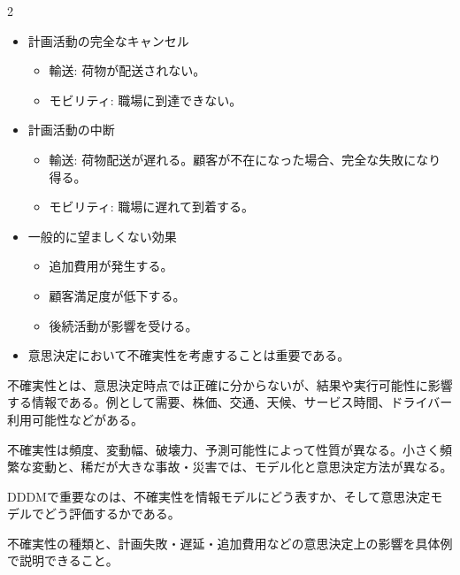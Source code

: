 \begin{multicols}{2}

\footnotesize

\raggedcolumns


\begin{itemize}
\item 計画活動の完全なキャンセル
\begin{itemize}
\item 輸送: 荷物が配送されない。
\item モビリティ: 職場に到達できない。
\end{itemize}
\item 計画活動の中断
\begin{itemize}
\item 輸送: 荷物配送が遅れる。顧客が不在になった場合、完全な失敗になり得る。
\item モビリティ: 職場に遅れて到着する。
\end{itemize}
\item 一般的に望ましくない効果
\begin{itemize}
\item 追加費用が発生する。
\item 顧客満足度が低下する。
\item 後続活動が影響を受ける。
\end{itemize}
\item 意思決定において不確実性を考慮することは重要である。
\end{itemize}

不確実性とは、意思決定時点では正確に分からないが、結果や実行可能性に影響する情報である。例として需要、株価、交通、天候、サービス時間、ドライバー利用可能性などがある。\par

不確実性は頻度、変動幅、破壊力、予測可能性によって性質が異なる。小さく頻繁な変動と、稀だが大きな事故・災害では、モデル化と意思決定方法が異なる。\par

DDDMで重要なのは、不確実性を情報モデルにどう表すか、そして意思決定モデルでどう評価するかである。\par

不確実性の種類と、計画失敗・遅延・追加費用などの意思決定上の影響を具体例で説明できること。\par


\end{multicols}
